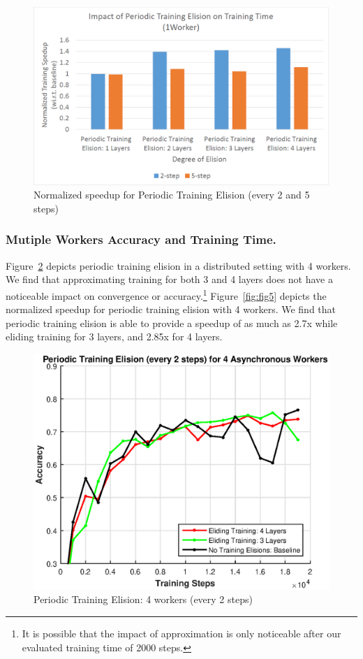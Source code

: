\begin{figure}[t]
	\centering
	\includegraphics[width=1.0\columnwidth]{figures/fig3.PNG}
	\caption{Normalized speedup for Periodic Training Elision (every 2 and 5 steps)}
	\label{fig:fig3}
\end{figure}

\subsubsection{Mutiple Workers Accuracy and Training Time.}
Figure~\ref{fig:fig4} depicts periodic training elision in a distributed setting with 4 workers. We find that approximating training for both 3 and 4 layers does not have a noticeable impact on convergence or accuracy.\footnote{It is possible that the impact of approximation is only noticeable after our evaluated training time of 2000 steps.} Figure~\ref{fig:fig5} depicts the normalized speedup for periodic training elision with 4 workers. We find that periodic training elision is able to provide a speedup of as much as 2.7x while eliding training for 3 layers, and 2.85x for 4 layers. 

\begin{figure}[t]
	\centering
	\includegraphics[width=0.8\columnwidth]{figures/fig4.eps}
	\caption{Periodic Training Elision: 4 workers (every 2 steps)}
	\label{fig:fig4}
\end{figure}

